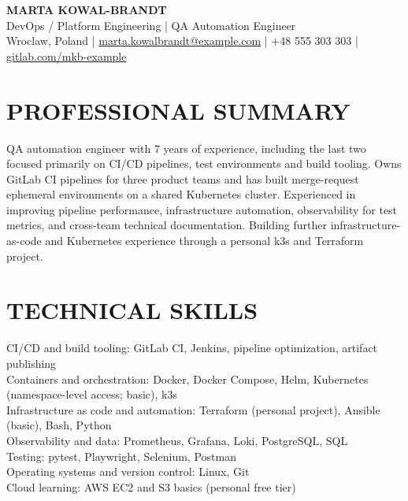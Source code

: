 \documentclass[11pt,a4paper]{article}
\begin{document}
\begin{center}
{\Huge\bfseries\color{primarycolor} MARTA KOWAL-BRANDT}\\[0.3em]
{\large DevOps / Platform Engineering | QA Automation Engineer}\\[0.25em]
Wroclaw, Poland | \href{mailto:marta.kowalbrandt@example.com}{marta.kowalbrandt@example.com} | +48 555 303 303 | \href{https://gitlab.com/mkb-example}{gitlab.com/mkb-example}
\end{center}

\section*{PROFESSIONAL SUMMARY}
QA automation engineer with 7 years of experience, including the last two focused primarily on CI/CD pipelines, test environments and build tooling. Owns GitLab CI pipelines for three product teams and has built merge-request ephemeral environments on a shared Kubernetes cluster. Experienced in improving pipeline performance, infrastructure automation, observability for test metrics, and cross-team technical documentation. Building further infrastructure-as-code and Kubernetes experience through a personal k3s and Terraform project.

\section*{TECHNICAL SKILLS}
CI/CD and build tooling: GitLab CI, Jenkins, pipeline optimization, artifact publishing\\
Containers and orchestration: Docker, Docker Compose, Helm, Kubernetes (namespace-level access; basic), k3s\\
Infrastructure as code and automation: Terraform (personal project), Ansible (basic), Bash, Python\\
Observability and data: Prometheus, Grafana, Loki, PostgreSQL, SQL\\
Testing: pytest, Playwright, Selenium, Postman\\
Operating systems and version control: Linux, Git\\
Cloud learning: AWS EC2 and S3 basics (personal free tier)
\end{document}
